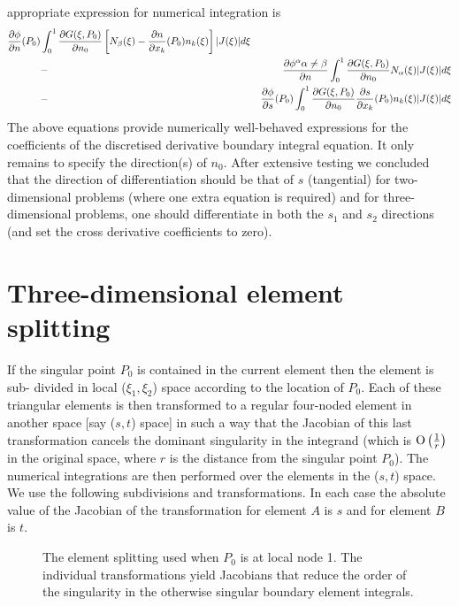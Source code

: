 appropriate expression for numerical integration is
\begin{eqnarray}
  \dfrac{\partial \phi}{\partial n} (P_{0}) &\int_{0}^{1}\frac{\partial G(\xi,P_{0})}
  {\partial n_{0}}\left[ N_{\beta}(\xi)- \dfrac{\partial n}{\partial x_{k}} (P_{0})n_{k}(\xi)\right]
  |J(\xi)|d\xi \nonumber\\
 &-& \dfrac{\partial \phi^\alpha{\alpha\neq\beta}}{\partial n} \int_{0}^{1}
  \frac{\partial G(\xi,P_{0})}{\partial n_{0}}N_{\alpha}(\xi)|J(\xi)|d\xi\nonumber\\
 &-& \dfrac{\partial \phi}{\partial s} (P_{0})\int_{0}^{1}\frac{\partial G(\xi,P_{0})}
  {\partial n_{0}} \dfrac{\partial s}{\partial x_{k}} (P_{0})n_{k}(\xi)|J(\xi)|d\xi
 \label{eqn:approp}
\end{eqnarray}
The above equations provide numerically well-behaved expressions for the
coefficients of the discretised derivative boundary integral equation.  It
only remains to specify the direction(s) of $n_{0}$.  After extensive testing
\cite{tomlinson:1996} we concluded that the direction of differentiation
should be that of $s$ (\ie  tangential) for two-dimensional problems (where
one extra equation is required) and for three-dimensional problems, one should
differentiate in both the $s_{1}$ and $s_{2}$ directions (and set the cross
derivative coefficients to zero).

\section{Three-dimensional element splitting}

If the singular point $P_{0}$ is contained in the current element then the
element is sub- divided in local ($\xi_{1}, \xi_{2}$) space according to the
location of $P_{0}$.  Each of these triangular elements is then transformed to
a regular four-noded element in another space [say ($s, t$) space] in such a
way that the Jacobian of this last transformation cancels the dominant
singularity in the integrand (which is $ \mathrm{O}\left( \frac{1}{r} \right) $ in the original
space, where $r$ is the distance from the singular point $P_{0}$).  The
numerical integrations are then performed over the elements in the ($s,t$)
space.  We use the following subdivisions and transformations.  In each case
the absolute value of the Jacobian of the transformation for element $A$ is
$s$ and for element $B$ is $t$.

\begin{figure}
\centering
 
\caption[The element splitting used when $P_{0}$ is at local node 1]{The
  element splitting used when $P_{0}$ is at local node 1.  The individual
  transformations yield Jacobians that reduce the order of the singularity in
  the otherwise singular boundary element integrals.}
\label{fig:elemsplitting}
\end{figure}

